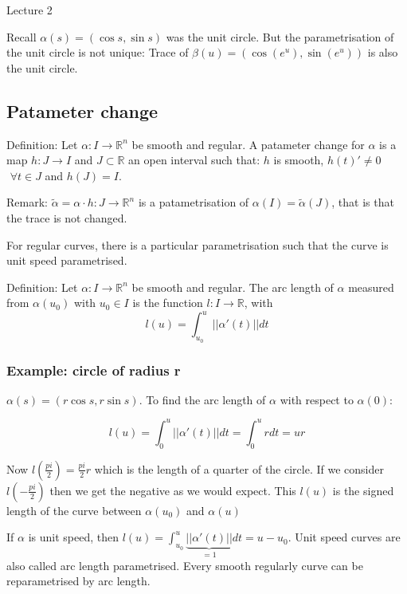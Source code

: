 \begin{center}

Lecture 2

\end{center}

Recall $\alpha (s) = (\cos s, \sin s)$ was the unit circle. But the parametrisation of the unit circle is not unique: Trace of $\beta (u) = (\cos (e^u), \sin (e^u))$ is also the unit circle.

\subsection{Patameter change}

Definition: Let $\alpha : I \rightarrow \mathbb{R}^n$ be smooth and regular. A patameter change for $\alpha$ is a map $h : J \rightarrow I$ and $J \subset \mathbb{R}$ an open interval such that: $h$ is smooth, $h(t)' \neq 0$ $\, \, \forall t \in J$ and $h(J) = I$.

Remark: $\tilde{\alpha} = \alpha \cdot h : J \rightarrow \mathbb{R}^n$ is a patametrisation of $\alpha (I) = \tilde{\alpha} (J)$, that is that the trace is not changed.

For regular curves, there is a particular parametrisation such that the curve is unit speed parametrised.

Definition: Let $\alpha : I \rightarrow \mathbb{R}^n$ be smooth and regular. The arc length of $\alpha$ measured from $\alpha (u_0)$ with $u_0 \in I$ is the function $l : I \rightarrow \mathbb{R}$, with $$l (u) = \int_{u_0}^u || \alpha ' (t) || dt$$

\subsubsection*{Example: circle of radius r} 

$\alpha (s) = (r \cos s, r \sin s)$. To find the arc length of $\alpha$ with respect to $\alpha(0)$:

$$l(u) = \int_0^u || \alpha ' (t) || dt = \int_0^u r dt = ur$$

Now $l(\frac{pi}{2}) = \frac{pi}{2} r$ which is the length of a quarter of the circle. If we consider $l(-\frac{pi}{2})$ then we get the negative as we would expect. This $l(u)$ is the signed length of the curve between $\alpha(u_0)$ and $\alpha (u)$

If $\alpha$ is unit speed, then $l(u) = \int_{u_0}^u \underbrace{|| \alpha ' (t) ||}_{=1} dt = u - u_0$. Unit speed curves are also called arc length parametrised. Every smooth regularly curve can be reparametrised by arc length.

